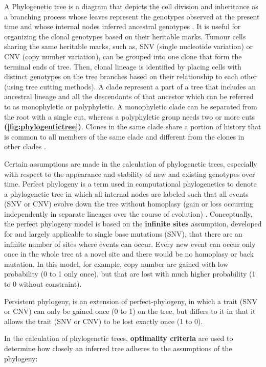 A Phylogenetic tree is a diagram that depicts the cell division and inheritance as a branching process whose leaves represent the genotypes observed at the present time and whose internal nodes inferred ancestral genotypes \cite{satas2020scarlet}.
It is useful for organizing the clonal genotypes based on their heritable marks. Tumour cells sharing the same heritable marks, such as, SNV (single nucleotide variation) or CNV (copy number variation), can be grouped into one clone that form the terminal ends of tree. Then, clonal lineage is identified by placing cells with distinct genotypes on the tree branches based on their relationship to each other (using tree cutting methods). A clade represent a part of a tree that includes an ancestral lineage and all the descendants of that ancestor which can be referred to as monophyletic or polyphyletic.  A monophyletic clade can be separated from the root with a single cut, whereas a polyphyletic group needs two or more cuts \textbf{(\autoref{fig:phylogentictree})}. Clones in the same clade share a portion of history that is common to all members of the same clade and different from the clones in other clades \cite{baum2008reading, baum2008phylogenics}.

Certain assumptions are made in the calculation of phylogenetic trees, especially with respect to the appearance and stability of new and existing genotypes over time.
Perfect phylogeny is a term used in computational phylogenetics to denote a phylogenetic tree in which all internal nodes are labeled such that all events (SNV or CNV) evolve down the tree without homoplasy (gain or loss occurring independently in separate lineages over the course of evolution) \cite{gusfield1997algorithms}. Conceptually, the perfect phylogeny model is based on the \textbf{infinite sites} assumption, developed for and largely applicable to single base mutations (SNV), that there are an infinite number of sites  where events can occur. Every new event can occur only once in the whole tree at a novel site and there would be no homoplasy or back mutation. In this model, for example, copy number are gained with low probability (0 to 1 only once), but that are lost with much higher probability (1 to 0 without constraint).

Persistent phylogeny, is an extension of perfect-phylogeny, in which a trait (SNV or CNV) can only be gained once (0 to 1) on the tree, but differs to it in that it allows the trait (SNV or CNV) to be lost exactly once (1 to 0).

In the calculation of phylogenetic trees, \textbf{optimality criteria} are used to determine how closely an inferred tree adheres to the assumptions of the phylogeny:

